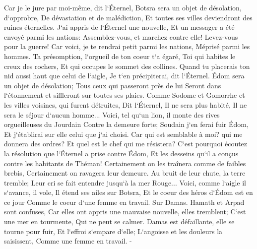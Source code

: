 \verse Car je le jure par moi-même, dit l`Éternel, Botsra sera un objet de désolation, d`opprobre, De dévastation et de malédiction, Et toutes ses villes deviendront des ruines éternelles. 
\verse J`ai appris de l`Éternel une nouvelle, Et un messager a été envoyé parmi les nations: Assemblez-vous, et marchez contre elle! Levez-vous pour la guerre! 
\verse Car voici, je te rendrai petit parmi les nations, Méprisé parmi les hommes. 
\verse Ta présomption, l`orgueil de ton coeur t`a égaré, Toi qui habites le creux des rochers, Et qui occupes le sommet des collines. Quand tu placerais ton nid aussi haut que celui de l`aigle, Je t`en précipiterai, dit l`Éternel. 
\verse Édom sera un objet de désolation; Tous ceux qui passeront près de lui Seront dans l`étonnement et siffleront sur toutes ses plaies. 
\verse Comme Sodome et Gomorrhe et les villes voisines, qui furent détruites, Dit l`Éternel, Il ne sera plus habité, Il ne sera le séjour d`aucun homme... 
\verse Voici, tel qu`un lion, il monte des rives orgueilleuses du Jourdain Contre la demeure forte; Soudain j`en ferai fuir Édom, Et j`établirai sur elle celui que j`ai choisi. Car qui est semblable à moi? qui me donnera des ordres? Et quel est le chef qui me résistera? 
\verse C`est pourquoi écoutez la résolution que l`Éternel a prise contre Édom, Et les desseins qu`il a conçus contre les habitants de Théman! Certainement on les traînera comme de faibles brebis, Certainement on ravagera leur demeure. 
\verse Au bruit de leur chute, la terre tremble; Leur cri se fait entendre jusqu`à la mer Rouge... 
\verse Voici, comme l`aigle il s`avance, il vole, Il étend ses ailes sur Botsra, Et le coeur des héros d`Édom est en ce jour Comme le coeur d`une femme en travail. 
\verse Sur Damas. Hamath et Arpad sont confuses, Car elles ont appris une mauvaise nouvelle, elles tremblent; C`est une mer en tourmente, Qui ne peut se calmer. 
\verse Damas est défaillante, elle se tourne pour fuir, Et l`effroi s`empare d`elle; L`angoisse et les douleurs la saisissent, Comme une femme en travail. - 
